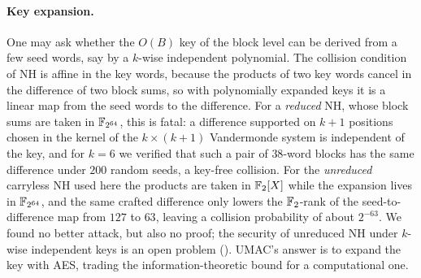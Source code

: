\paragraph{Key expansion.}
One may ask whether the $O(B)$ key of the block level can be derived from a few
seed words, say by a $k$-wise independent polynomial.  The collision condition
of NH is affine in the key words, because the products of two key words cancel
in the difference of two block sums, so with polynomially expanded keys it is a
linear map from the seed words to the difference.  For a \emph{reduced} NH,
whose block sums are taken in $\mathbb{F}_{2^{64}}$, this is fatal: a difference
supported on $k+1$ positions chosen in the kernel of the $k\times(k+1)$
Vandermonde system is independent of the key, and for $k=6$ we verified that
such a pair of $38$-word blocks has the same difference under $200$ random
seeds, a key-free collision.  For the \emph{unreduced} carryless NH used here
the products are taken in $\mathbb{F}_2[X]$ while the expansion lives in
$\mathbb{F}_{2^{64}}$, and the same crafted difference only lowers the $\mathbb{F}_2$-rank of
the seed-to-difference map from $127$ to $63$, leaving a collision probability
of about $2^{-63}$.  We found no better attack, but also no proof; the
security of unreduced NH under $k$-wise independent keys is an open problem
().  UMAC's answer is to expand the key with AES,
trading the information-theoretic bound for a computational one.

